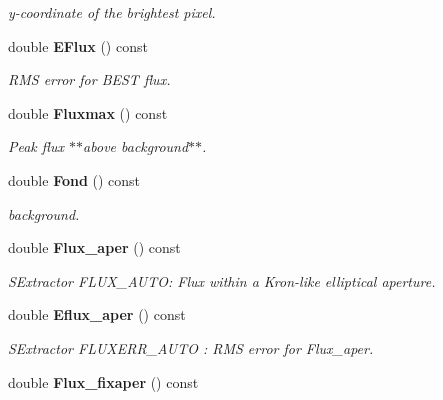 \begin{CompactItemize}
\begin{CompactList}\small\item\em y-coordinate of the brightest pixel.\item\end{CompactList}\item 
{}
double {\bf EFlux} () const\label{class_sestar_a14}

\begin{CompactList}\small\item\em RMS error for BEST flux.\item\end{CompactList}\item 
{}
double {\bf Fluxmax} () const\label{class_sestar_a15}

\begin{CompactList}\small\item\em Peak flux $\ast$$\ast$above background$\ast$$\ast$.\item\end{CompactList}\item 
{}
double {\bf Fond} () const\label{class_sestar_a16}

\begin{CompactList}\small\item\em background.\item\end{CompactList}\item 
{}
double {\bf Flux\_\-aper} () const\label{class_sestar_a17}

\begin{CompactList}\small\item\em SExtractor FLUX\_\-AUTO: Flux within a Kron-like elliptical aperture.\item\end{CompactList}\item 
{}
double {\bf Eflux\_\-aper} () const\label{class_sestar_a18}

\begin{CompactList}\small\item\em SExtractor FLUXERR\_\-AUTO : RMS error for Flux\_\-aper.\item\end{CompactList}\item 
{}
double {\bf Flux\_\-fixaper} () const\label{class_sestar_a19}


\end{CompactItemize}
